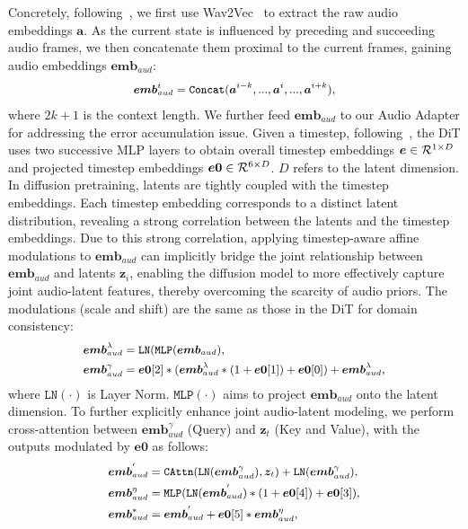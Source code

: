 Concretely, following~\cite{tian2024emo, kong2025let}, we first use Wav2Vec~\cite{baevski2020wav2vec} to extract the raw audio embeddings $\bm{a}$. As the current state is influenced by preceding and succeeding audio frames, we then concatenate them proximal to the current frames, gaining audio embeddings $\bm{emb}_{aud}$:
\begin{equation}\small
\label{eq:audio_embeddings}
\begin{aligned}
     \bm{emb}_{aud}^{i}=\mathtt{Concat}(\bm{a}^{i-k},..., \bm{a}^{i},...,\bm{a}^{i+k}),
\end{aligned}
\end{equation}
where $2k+1$ is the context length. We further feed $\bm{emb}_{aud}$ to our Audio Adapter for addressing the error accumulation issue. Given a timestep, following~\cite{wan2025}, the DiT uses two successive MLP layers to obtain overall timestep embeddings $\bm{e}\in{\cal{R}}^{1 \times D}$ and projected timestep embeddings $\bm{e0}\in{\cal{R}}^{6 \times D}$. $D$ refers to the latent dimension. 
In diffusion pretraining, latents are tightly coupled with the timestep embeddings. Each timestep embedding corresponds to a distinct latent distribution, revealing a strong correlation between the latents and the timestep embeddings.
Due to this strong correlation, applying timestep-aware affine modulations to $\bm{emb}_{aud}$ can implicitly bridge the joint relationship between $\bm{emb}_{aud}$ and latents $\bm{z}_{i}$, enabling the diffusion model to more effectively capture joint audio-latent features, thereby overcoming the scarcity of audio priors. The modulations (scale and shift) are the same as those in the DiT for domain consistency:
\begin{equation}\small
\label{eq:audio_embeddings}
\begin{aligned}
     \bm{emb}_{aud}^{\lambda}&=\mathtt{LN}(\mathtt{MLP}(\bm{emb}_{aud}), \\
     \bm{emb}_{aud}^{\gamma}&=\bm{e0}[2]*(\bm{emb}_{aud}^{\lambda}*(1+\bm{e0}[1])+\bm{e0}[0])+\bm{emb}_{aud}^{\lambda},
\end{aligned}
\end{equation}
where $\mathtt{LN}(\cdot)$ is Layer Norm. $\mathtt{MLP}(\cdot)$ aims to project $\bm{emb}_{aud}$ onto the latent dimension. To further explicitly enhance joint audio-latent modeling, we perform cross-attention between $\bm{emb}_{aud}^{\gamma}$ (Query) and $\bm{z}_{t}$ (Key and Value), with the outputs modulated by $\bm{e0}$ as follows:
\begin{equation}\small
\label{eq:modulation}
\begin{aligned}
     \bm{emb}_{aud}^{'}&=\mathtt{CAttn}(\mathtt{LN}(\bm{emb}_{aud}^{\gamma}), \bm{z}_{t})+\mathtt{LN}(\bm{emb}_{aud}^{\gamma}), \\
     \bm{emb}_{aud}^{\eta}&=\mathtt{MLP}(\mathtt{LN}(\bm{emb}_{aud}^{'})*(1+\bm{e0}[4])+\bm{e0}[3]), \\
     \bm{emb}_{aud}^{*}&=\bm{emb}_{aud}^{'}+\bm{e0}[5]*\bm{emb}_{aud}^{\eta},
\end{aligned}
\end{equation}
